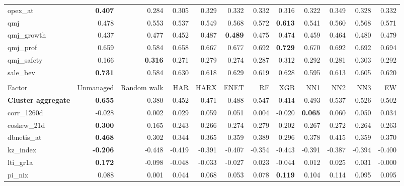\begin{landscape}
\begin{longtable}{>{\raggedright\arraybackslash}p{2.6cm}rrrrrrrrrrr}
opex\_at & \textbf{0.407} & 0.284 & 0.305 & 0.329 & 0.332 & 0.332 & 0.316 & 0.322 & 0.349 & 0.328 & 0.332 \\
qmj & 0.478 & 0.553 & 0.537 & 0.549 & \cellcolor{blue!10}0.568 & \cellcolor{blue!10}0.572 & \textbf{\cellcolor{blue!10}0.613} & 0.541 & \cellcolor{blue!10}0.560 & \cellcolor{blue!10}0.568 & \cellcolor{blue!10}0.571 \\
qmj\_growth & 0.437 & 0.477 & 0.452 & \cellcolor{blue!10}0.487 & \textbf{\cellcolor{blue!10}0.489} & 0.475 & 0.474 & 0.459 & 0.464 & \cellcolor{blue!10}0.480 & \cellcolor{blue!10}0.479 \\
qmj\_prof & 0.659 & 0.584 & 0.658 & \cellcolor{blue!10}0.667 & \cellcolor{blue!10}0.677 & \cellcolor{blue!10}0.692 & \textbf{\cellcolor{blue!10}0.729} & \cellcolor{blue!10}0.670 & \cellcolor{blue!10}0.692 & \cellcolor{blue!10}0.692 & \cellcolor{blue!10}0.694 \\
qmj\_safety & 0.166 & \textbf{0.316} & 0.271 & 0.279 & 0.274 & 0.287 & 0.312 & 0.292 & 0.281 & 0.303 & 0.292 \\
sale\_bev & \textbf{0.731} & 0.584 & 0.630 & 0.618 & 0.629 & 0.619 & 0.628 & 0.595 & 0.613 & 0.605 & 0.620 \\
\hline
\multicolumn{12}{@{}l}{\textit{Panel J. Seasonality}} \\
\hline
Factor & Unmanaged & Random walk & HAR & HARX & ENET & RF & XGB & NN1 & NN2 & NN3 & EW \\
\hline
\textbf{Cluster aggregate} & \textbf{0.655} & 0.380 & 0.452 & 0.471 & 0.488 & 0.547 & 0.414 & 0.493 & 0.537 & 0.526 & 0.502 \\
corr\_1260d & -0.028 & 0.002 & \cellcolor{blue!10}0.029 & \cellcolor{blue!10}0.059 & \cellcolor{blue!10}0.051 & \cellcolor{blue!10}0.004 & -0.020 & \textbf{\cellcolor{blue!10}0.065} & \cellcolor{blue!10}0.060 & \cellcolor{blue!10}0.050 & \cellcolor{blue!10}0.034 \\
coskew\_21d & \textbf{0.300} & 0.165 & 0.243 & 0.266 & 0.274 & 0.279 & 0.202 & 0.267 & 0.272 & 0.264 & 0.263 \\
dbnetis\_at & \textbf{0.468} & 0.302 & 0.344 & 0.365 & 0.359 & 0.389 & 0.296 & 0.378 & 0.415 & 0.359 & 0.370 \\
kz\_index & \textbf{-0.206} & -0.448 & -0.419 & -0.391 & -0.407 & -0.354 & -0.443 & -0.391 & -0.387 & -0.394 & -0.400 \\
lti\_gr1a & \textbf{0.172} & -0.098 & -0.048 & -0.033 & -0.027 & 0.023 & -0.044 & 0.012 & 0.025 & 0.031 & -0.000 \\
pi\_nix & 0.088 & 0.001 & 0.044 & 0.068 & 0.053 & 0.078 & \textbf{\cellcolor{blue!10}0.119} & \cellcolor{blue!10}0.104 & \cellcolor{blue!10}0.114 & \cellcolor{blue!10}0.095 & \cellcolor{blue!10}0.095 \\

\end{longtable}
\end{landscape}
